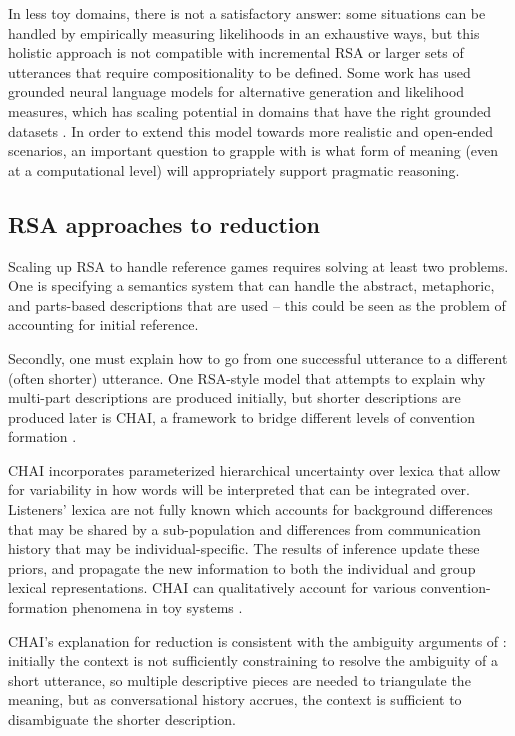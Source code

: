\documentclass[]{article}
\begin{document}
 In less toy domains, there is not a satisfactory answer: some situations can be handled by empirically measuring likelihoods in an exhaustive ways, but this holistic approach is not compatible with incremental RSA \citep{cohn-gordon2018a} or larger sets of utterances that require compositionality to be defined. Some work has used grounded neural language models for alternative generation and likelihood measures, which has scaling potential in domains that have the right grounded datasets \citep{monroe2015, white2020, cohn-gordon2018}.  In order to extend this model towards more realistic and open-ended scenarios, an important question to grapple with is what form of meaning (even at a computational level) will appropriately support pragmatic reasoning. 
 
 

\subsection{RSA approaches to reduction}
Scaling up RSA to handle reference games requires solving at least two problems. One is specifying a semantics system that can handle the abstract, metaphoric, and parts-based descriptions that are used -- this could be seen as the problem of accounting for initial reference. 

Secondly, one must explain how to go from one successful utterance to a different (often shorter) utterance. One RSA-style model that attempts to explain why multi-part descriptions are produced initially, but shorter descriptions are produced later is CHAI,  a framework to bridge different levels of convention formation \citep{hawkins2021}.

CHAI incorporates parameterized hierarchical uncertainty over lexica that allow for variability in how words will be interpreted that can be integrated over. Listeners' lexica are not fully known which accounts for background differences that may be shared by a sub-population and differences from communication history that may be individual-specific. The results of inference update these priors, and propagate the new information to both the individual and group lexical representations. CHAI can qualitatively account for various convention-formation phenomena in toy systems \citep{hawkins2021}.

CHAI's explanation for reduction is consistent with the ambiguity arguments of \citet{piantadosi2012}: initially the context is not sufficiently constraining to resolve the ambiguity of a short utterance, so multiple descriptive pieces are needed to triangulate the meaning, but as conversational history accrues, the context is sufficient to disambiguate the shorter description. 
\end{document}
